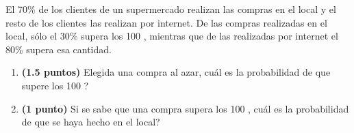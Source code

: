 
El 70\% de los clientes de un supermercado realizan las compras en el local y el resto de los clientes las realizan por internet. De las compras realizadas en el local, sólo el 30\% supera los 100 \texteuro{}, mientras que de las realizadas por internet el 80\% supera esa cantidad.
\begin{enumerate}[label=\alph*)]
\item \textbf{(1.5 puntos)} Elegida una compra al azar, \textquestiondown{}cuál es la probabilidad de que supere los 100 \texteuro{}?
\item \textbf{(1 punto)} Si se sabe que una compra supera los 100 \texteuro{}, \textquestiondown{}cuál es la probabilidad de que se haya hecho en el local?
\end{enumerate}
